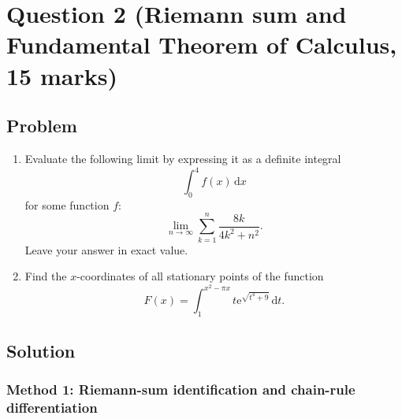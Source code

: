 \documentclass[12pt]{article}
\newcommand{\dd}{\,\mathrm{d}}
\newcommand{\ee}{\mathrm{e}}
\begin{document}
\newpage
\section{Question 2 (Riemann sum and Fundamental Theorem of Calculus, 15 marks)}

\subsection{Problem}

\begin{enumerate}[label=(\alph*)]
\item Evaluate the following limit by expressing it as a definite integral
\[
\int_0^4 f(x)\dd x
\]
for some function $f$:
\[
\lim_{n\to\infty}\sum_{k=1}^n
\frac{8k}{4k^2+n^2}.
\]
Leave your answer in exact value.

\item Find the $x$-coordinates of all stationary points of the function
\[
F(x)=\int_1^{x^2-\pi x} t\ee^{\sqrt{t^4+9}}\dd t.
\]
\end{enumerate}

\newpage
\subsection{Solution}

\subsubsection{Method 1: Riemann-sum identification and chain-rule differentiation}
\end{document}
